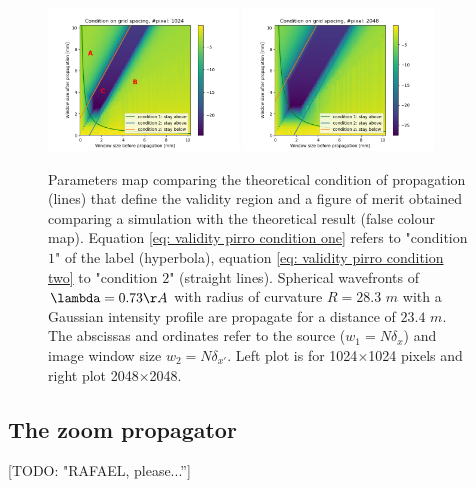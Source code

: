 \documentclass{iucr}              %
\newcommand{\todo}[1]{{\color{red}[TODO: "#1'']}}
\begin{document}
\begin{figure}
\label{fig: comparison validity conditions R=28.3}
\caption{
Parameters map comparing the theoretical condition of propagation (lines) that define the validity region and a figure of merit obtained comparing a simulation with the theoretical result (false colour map). Equation \ref{eq: validity pirro condition one} refers to
"condition $1$" of the label (hyperbola), equation \ref{eq: validity pirro condition two} to "condition $2$" (straight lines). Spherical wavefronts of $\lambda=0.73 \AA$ with radius of curvature $R = 28.3$ $m$ with a Gaussian intensity profile are propagate for a distance of $23.4$ $m$. The abscissas and ordinates refer to the source ($w_1=N \delta_x$) and image window size $w_2 = N \delta_{x'}$. Left plot is for 1024$\times$1024 pixels and right plot 2048$\times$2048. 
}
\includegraphics[width=0.45\textwidth]{npixel1024-prop_dist23-R28-Finf_con_zone.png}
\includegraphics[width=0.45\textwidth]{npixel2048-prop_dist23-R28-Finf.png}
\end{figure}

\subsection{The zoom propagator}
\todo{RAFAEL, please...}
\end{document}
